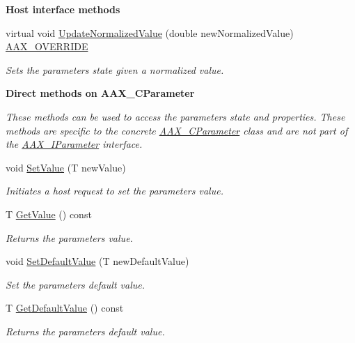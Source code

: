 \begin{Indent}{\bf Host interface methods}\par
\begin{DoxyCompactItemize}
\item 
virtual void \hyperlink{a00033_a8a70b3c8bcff486c18e9a6e5c8ce4dda}{Update\+Normalized\+Value} (double new\+Normalized\+Value) \hyperlink{a00149_ac2f24a5172689ae684344abdcce55463}{A\+A\+X\+\_\+\+O\+V\+E\+R\+R\+I\+D\+E}
\begin{DoxyCompactList}\small\item\em Sets the parameter\textquotesingle{}s state given a normalized value. \end{DoxyCompactList}\end{DoxyCompactItemize}
\end{Indent}
\begin{Indent}{\bf Direct methods on A\+A\+X\+\_\+\+C\+Parameter}\par
{\em These methods can be used to access the parameter\textquotesingle{}s state and properties. These methods are specific to the concrete \hyperlink{a00033}{A\+A\+X\+\_\+\+C\+Parameter} class and are not part of the \hyperlink{a00108}{A\+A\+X\+\_\+\+I\+Parameter} interface. }\begin{DoxyCompactItemize}
\item 
void \hyperlink{a00033_a4dd6d99de8dc4440bac3ae4eefa19f94}{Set\+Value} (T new\+Value)
\begin{DoxyCompactList}\small\item\em Initiates a host request to set the parameter\textquotesingle{}s value. \end{DoxyCompactList}\item 
T \hyperlink{a00033_a3b28f6b43cd48ea46956e77951df5e5a}{Get\+Value} () const 
\begin{DoxyCompactList}\small\item\em Returns the parameter\textquotesingle{}s value. \end{DoxyCompactList}\item 
void \hyperlink{a00033_af6f47fe823dd44a0434ca5041f08d0bd}{Set\+Default\+Value} (T new\+Default\+Value)
\begin{DoxyCompactList}\small\item\em Set the parameter\textquotesingle{}s default value. \end{DoxyCompactList}\item 
T \hyperlink{a00033_a9450b236467ee986d95fbc09731d59fd}{Get\+Default\+Value} () const 
\begin{DoxyCompactList}\small\item\em Returns the parameter\textquotesingle{}s default value. \end{DoxyCompactList}\item 

\end{DoxyCompactItemize}
\end{Indent}
